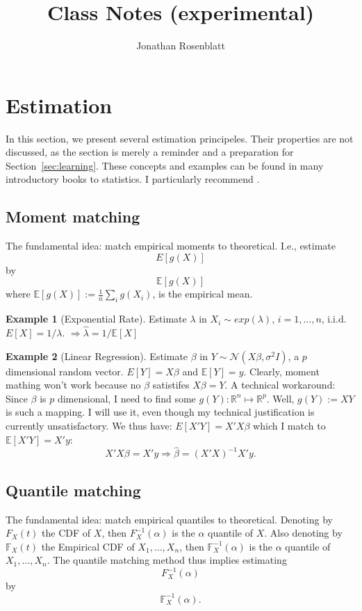 \documentclass[12pt,a4paper]{article}
\author{Jonathan Rosenblatt}
\title{Class Notes (experimental)}
\theoremstyle{plain}
\theoremstyle{definition}
\newtheorem{example}{Example}
\newcommand{\expect}[1]{E[#1]}
\newcommand{\expectn}[1]{\mathbb{E}[#1]}
\newcommand{\gauss}[1]{\mathcal{N}(#1)}
\newcommand{\cdf}[2]{F_{#1}(#2)}
\newcommand{\cdfn}[2]{\mathbb{F}_{#1}(#2)}
\newcommand{\icdf}[2]{F^{-1}_{#1}(#2)}
\newcommand{\icdfn}[2]{\mathbb{F}^{-1}_{#1}(#2)}
\begin{document}
\maketitle

\tableofcontents

\section{Estimation}
\label{sec:estimation} 
In this section, we present several estimation principeles. 
Their properties are not discussed, as the section is merely a reminder and a preparation for Section~\ref{sec:learning}.
These concepts and examples can be found in many introductory books to statistics. I particularly recommend \citep{wasserman_all_2004}.

\subsection{Moment matching}
\label{sec:moment_matching}

The fundamental idea: match empirical moments to theoretical. I.e., estimate
$$ \expect{g(X)}   $$
by 
$$ \expectn{g(X)}   $$
where $\expectn{g(X)}:=\frac{1}{n}  \sum_i g(X_i)$, is the empirical mean.

\begin{example}[Exponential Rate]

Estimate $\lambda$ in $X_i \sim exp(\lambda)$, $i=1,\dots,n$, i.i.d.
$\expect{X}=1/\lambda$.
$\Rightarrow \hat{\lambda}=1/\expectn{X}$ 

\end{example}


\begin{example}[Linear Regression]

Estimate $\beta$ in $Y \sim \gauss{X\beta,\sigma^2 I}$, a $p$ dimensional random vector.
$\expect{Y}=X\beta$ and $\expectn{Y}=y$.
Clearly, moment mathing won't work because no $\beta$ satistifes $X\beta=Y$.
A technical workaround:
Since $\beta$ is $p$ dimensional, I need to find some $g(Y): \mathbb{R}^n \mapsto \mathbb{R}^p$.
Well, $g(Y):=XY$ is such a mapping. I will use it, even though my technical justification is currently unsatisfactory. We thus have:
$\expect{X'Y}=X'X\beta$ which I match to $\expectn{X'Y}=X'y$:
$$
  X'X \beta = X' y \Rightarrow \hat{\beta}=(X'X)^{-1} X'y.
$$

\end{example}


\subsection{Quantile matching}
\label{sec:quantiles}
The fundamental idea: match empirical quantiles to theoretical. 
Denoting by $\cdf{X}{t}$ the CDF of $X$, then $\icdf{X}{\alpha}$ is the $\alpha$ quantile of $X$.
Also denoting by $\cdfn{X}{t}$ the Empirical CDF of $X_1,\dots, X_n$, then $\icdfn{X}{\alpha}$ is the $\alpha$ quantile of $X_1,\dots, X_n$.
The quantile matching method thus implies estimating
$$ \icdf{X}{\alpha}   $$
by 
$$ \icdfn{X}{\alpha}  . $$
\end{document}
